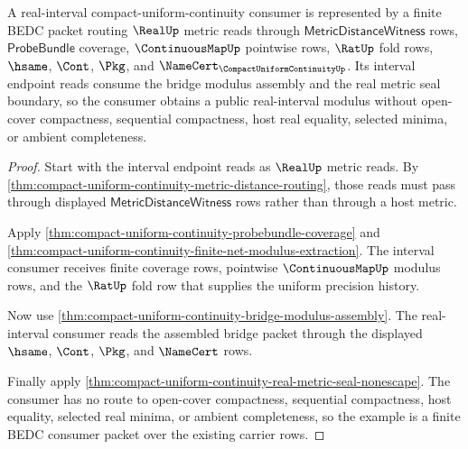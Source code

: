\begin{theorem}
\label{thm:compact-uniform-continuity-real-interval-consumer-example}
A real-interval compact-uniform-continuity consumer is represented by a finite BEDC packet routing $\RealUp$ metric reads through $\mathsf{MetricDistanceWitness}$ rows, $\mathsf{ProbeBundle}$ coverage, $\ContinuousMapUp$ pointwise rows, $\RatUp$ fold rows, $\hsame$, $\Cont$, $\Pkg$, and $\NameCert_{\CompactUniformContinuityUp}$. Its interval endpoint reads consume the bridge modulus assembly and the real metric seal boundary, so the consumer obtains a public real-interval modulus without open-cover compactness, sequential compactness, host real equality, selected minima, or ambient completeness.
\end{theorem}
\begin{proof}
Start with the interval endpoint reads as $\RealUp$ metric reads. By \autoref{thm:compact-uniform-continuity-metric-distance-routing}, those reads must pass through displayed $\mathsf{MetricDistanceWitness}$ rows rather than through a host metric.

Apply \autoref{thm:compact-uniform-continuity-probebundle-coverage} and \autoref{thm:compact-uniform-continuity-finite-net-modulus-extraction}. The interval consumer receives finite coverage rows, pointwise $\ContinuousMapUp$ modulus rows, and the $\RatUp$ fold row that supplies the uniform precision history.

Now use \autoref{thm:compact-uniform-continuity-bridge-modulus-assembly}. The real-interval consumer reads the assembled bridge packet through the displayed $\hsame$, $\Cont$, $\Pkg$, and $\NameCert$ rows.

Finally apply \autoref{thm:compact-uniform-continuity-real-metric-seal-nonescape}. The consumer has no route to open-cover compactness, sequential compactness, host equality, selected real minima, or ambient completeness, so the example is a finite BEDC consumer packet over the existing carrier rows.
\end{proof}

